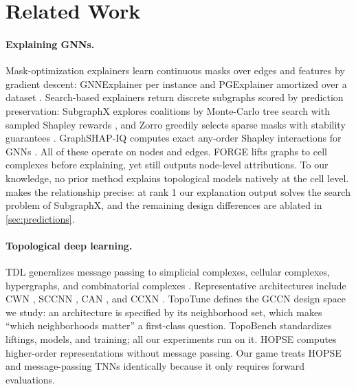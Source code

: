 \section{Related Work}
\label{sec:related}

\paragraph{Explaining GNNs.}
Mask-optimization explainers learn continuous masks over edges and
features by gradient descent: GNNExplainer per instance
\citep{ying2019gnnexplainer} and PGExplainer amortized over a dataset
\citep{luo2020parameterized}. Search-based explainers return discrete
subgraphs scored by prediction preservation: SubgraphX explores
coalitions by Monte-Carlo tree search with sampled Shapley rewards
\citep{yuan2021subgraphx}, and Zorro greedily selects sparse masks with
stability guarantees \citep{funke2023zorro}. GraphSHAP-IQ computes
exact any-order Shapley interactions for GNNs
\citep{muschalik2024graphshapiq}. All of these operate on nodes and
edges. FORGE \citep{forge2025} lifts graphs to cell complexes before
explaining, yet still outputs node-level attributions. To our
knowledge, no prior method explains topological models natively at the
cell level.  makes the relationship precise: at
rank 1 our explanation output solves the search problem of SubgraphX,
and the remaining design differences are ablated in
\cref{sec:predictions}.

\paragraph{Topological deep learning.}
TDL generalizes message passing to simplicial complexes, cellular
complexes, hypergraphs, and combinatorial complexes
\citep{hajij2023tdl,papamarkou2024position}. Representative
architectures include CWN \citep{bodnar2021cwn}, SCCNN
\citep{yang2022sccnn}, CAN \citep{giusti2022can}, and CCXN
\citep{hajij2020ccxn}. TopoTune \citep{papillon2025topotune} defines
the GCCN design space we study: an architecture is specified by its
neighborhood set, which makes ``which neighborhoods matter'' a
first-class question. TopoBench \citep{telyatnikov2024topobench}
standardizes liftings, models, and training; all our experiments run on
it. HOPSE \citep{hopse2025} computes higher-order representations
without message passing. Our game treats HOPSE and message-passing
TNNs identically because it only requires forward evaluations.

